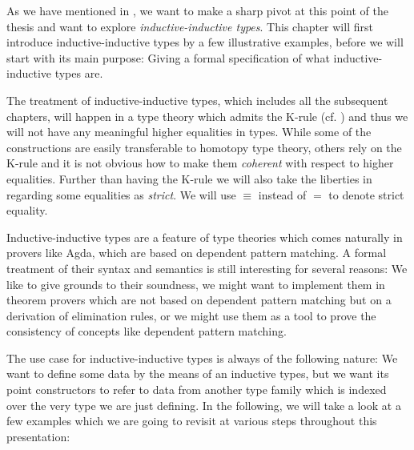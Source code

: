 As we have mentioned in , we want to make a sharp pivot at
this point of the thesis and want to explore \emph{inductive-inductive types}.
This chapter will first introduce inductive-inductive types by a few illustrative
examples, before we will start with its main purpose:
Giving a formal specification of what inductive-inductive types are.

The treatment of inductive-inductive types, which includes
all the subsequent chapters, will happen in a type theory which
admits the K-rule (cf. ) and thus we will not have any meaningful
higher equalities in types.
While some of the constructions are easily transferable to homotopy type theory,
others rely on the K-rule and it is not obvious how to make them \emph{coherent}
with respect to higher equalities.
Further than having the K-rule we will also take the liberties in regarding some
equalities as \emph{strict}.
We will use $\equiv$ instead of $=$ to denote strict equality.

Inductive-inductive types are a feature of type theories which comes naturally
in provers like Agda, which are based on dependent pattern matching.
A formal treatment of their syntax and semantics is still interesting for
several reasons:
We like to give
grounds to their soundness, we might want to implement them in theorem provers
which are not based on dependent pattern matching but on a derivation of elimination rules,
or we might use them as a tool to prove the consistency of concepts like
dependent pattern matching.

The use case for inductive-inductive types is always of the following nature:
We want to define some data by the means of an inductive types, but we want
its point constructors to refer to data from another type family which is indexed
over the very type we are just defining.
In the following, we will take a look at a few examples which we are going to
revisit at various steps throughout this presentation:

